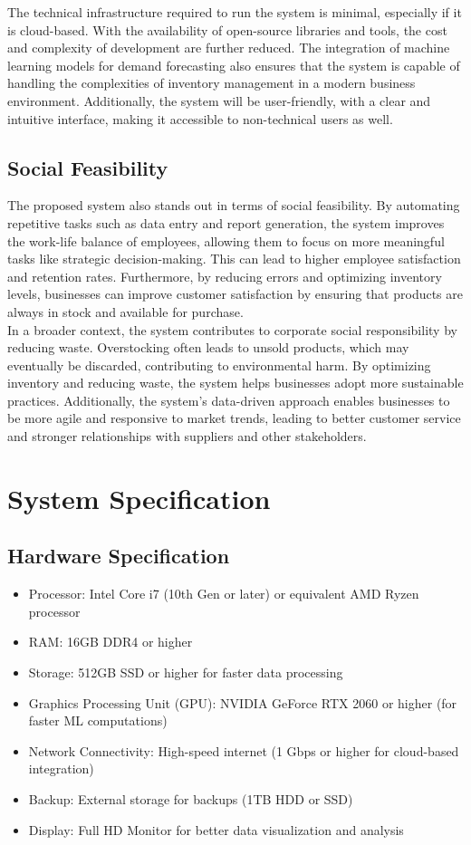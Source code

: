 \documentclass[10pt]{report}
\begin{document}
\begin{center}
The technical infrastructure required to run the system is minimal, especially if it is cloud-based. With the availability of open-source libraries and tools, the cost and complexity of development are further reduced. The integration of machine learning models for demand forecasting also ensures that the system is capable of handling the complexities of inventory management in a modern business environment. Additionally, the system will be user-friendly, with a clear and intuitive interface, making it accessible to non-technical users as well.

\subsection{Social Feasibility}
The proposed system also stands out in terms of social feasibility. By automating repetitive tasks such as data entry and report generation, the system improves the work-life balance of employees, allowing them to focus on more meaningful tasks like strategic decision-making. This can lead to higher employee satisfaction and retention rates. Furthermore, by reducing errors and optimizing inventory levels, businesses can improve customer satisfaction by ensuring that products are always in stock and available for purchase.\\

In a broader context, the system contributes to corporate social responsibility by reducing waste. Overstocking often leads to unsold products, which may eventually be discarded, contributing to environmental harm. By optimizing inventory and reducing waste, the system helps businesses adopt more sustainable practices. Additionally, the system's data-driven approach enables businesses to be more agile and responsive to market trends, leading to better customer service and stronger relationships with suppliers and other stakeholders.

\section{System Specification}

\subsection{Hardware Specification}
\begin{itemize}
    \item Processor: Intel Core i7 (10th Gen or later) or equivalent AMD Ryzen processor
    \item RAM: 16GB DDR4 or higher
    \item Storage: 512GB SSD or higher for faster data processing
    \item Graphics Processing Unit (GPU): NVIDIA GeForce RTX 2060 or higher (for faster ML computations)
    \item Network Connectivity: High-speed internet (1 Gbps or higher for cloud-based integration)
    \item Backup: External storage for backups (1TB HDD or SSD)
    \item Display: Full HD Monitor for better data visualization and analysis
\end{itemize}


\end{center}
\end{document}
